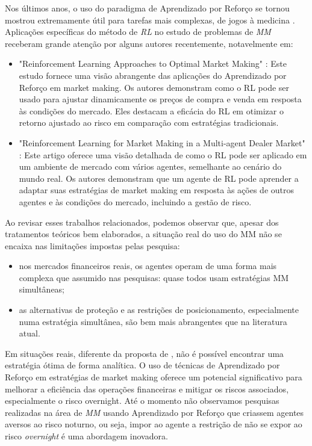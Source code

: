 Nos últimos anos, o uso do paradigma de Aprendizado por Reforço se tornou mostrou extremamente útil para tarefas mais complexas, de jogos à medicina \citep{Kaelbling1996}. 
Aplicações específicas do método de \textit{RL} no estudo de problemas de \textit{MM} receberam grande atenção por alguns autores recentemente, notavelmente em:
\begin{itemize}
    \item "Reinforcement Learning Approaches to Optimal Market Making" \citep{Gasperov2021}: Este estudo fornece uma visão abrangente das aplicações do Aprendizado por Reforço em market making. Os autores demonstram como o RL pode ser usado para ajustar dinamicamente os preços de compra e venda em resposta às condições do mercado. Eles destacam a eficácia do RL em otimizar o retorno ajustado ao risco em comparação com estratégias tradicionais.
    \item "Reinforcement Learning for Market Making in a Multi-agent Dealer Market" \citep{Ganesh2019}: Este artigo oferece uma visão detalhada de como o RL pode ser aplicado em um ambiente de mercado com vários agentes, semelhante ao cenário do mundo real. Os autores demonstram que um agente de RL pode aprender a adaptar suas estratégias de market making em resposta às ações de outros agentes e às condições do mercado, incluindo a gestão de risco.
\end{itemize}

Ao revisar esses trabalhos relacionados, podemos observar que, apesar dos tratamentos teóricos bem elaborados, a situação real do uso do MM não se encaixa nas limitações impostas pelas pesquisa:

\begin{itemize}
    \item nos mercados financeiros reais, os agentes operam de uma forma mais complexa que assumido nas pesquisas: quase todos usam estratégias MM simultâneas;
    \item as alternativas de proteção e as restrições de posicionamento, especialmente numa estratégia simultânea, são bem mais abrangentes que na literatura atual. 
\end{itemize}

Em situações reais, diferente da proposta de \citet{Avellaneda2008}, não é possível encontrar uma estratégia ótima de forma analítica. O uso de técnicas de Aprendizado por Reforço em estratégias de market making oferece um potencial significativo para melhorar a eficiência das operações financeiras e mitigar os riscos associados, especialmente o risco overnight. Até o momento não observamos pesquisas realizadas na área de \textit{MM} usando Aprendizado por Reforço que criassem agentes aversos ao risco noturno, ou seja, impor ao agente a restrição de não se expor ao risco \textit{overnight} é uma abordagem inovadora.

